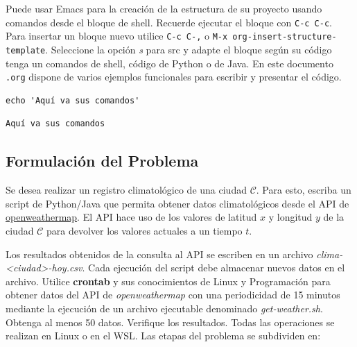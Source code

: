 \documentclass{article}
\begin{document}
Puede usar Emacs para la creación de la estructura de su proyecto
usando comandos desde el bloque de shell. Recuerde ejecutar el bloque
con \texttt{C-c C-c}. Para insertar un bloque nuevo utilice \texttt{C-c C-,} o \texttt{M-x
org-insert-structure-template}. Seleccione la opción \emph{s} para src y
adapte el bloque según su código tenga un comandos de shell, código de
Python o de Java. En este documento \texttt{.org} dispone de varios ejemplos
funcionales para escribir y presentar el código.

\begin{verbatim}
echo 'Aquí va sus comandos'
\end{verbatim}

\label{org063ff70}
\begin{verbatim}
Aquí va sus comandos
\end{verbatim}
\subsection{Formulación del Problema}
\label{sec:org57b5f44}
Se desea realizar un registro climatológico de una ciudad
\(\mathcal{C}\). Para esto, escriba un script de Python/Java que permita
obtener datos climatológicos desde el API de \href{https://openweathermap.org/current\#one}{openweathermap}. El API
hace uso de los valores de latitud \(x\) y longitud \(y\) de la ciudad
\(\mathcal{C}\) para devolver los valores actuales a un tiempo \(t\).

Los resultados obtenidos de la consulta al API se escriben en un
archivo \emph{clima-<ciudad>-hoy.csv}. Cada ejecución del script debe
almacenar nuevos datos en el archivo. Utilice \textbf{crontab} y sus
conocimientos de Linux y Programación para obtener datos del API de
\emph{openweathermap} con una periodicidad de 15 minutos mediante la
ejecución de un archivo ejecutable denominado
\emph{get-weather.sh}. Obtenga al menos 50 datos. Verifique los
resultados. Todas las operaciones se realizan en Linux o en el
WSL. Las etapas del problema se subdividen en:
\end{document}
